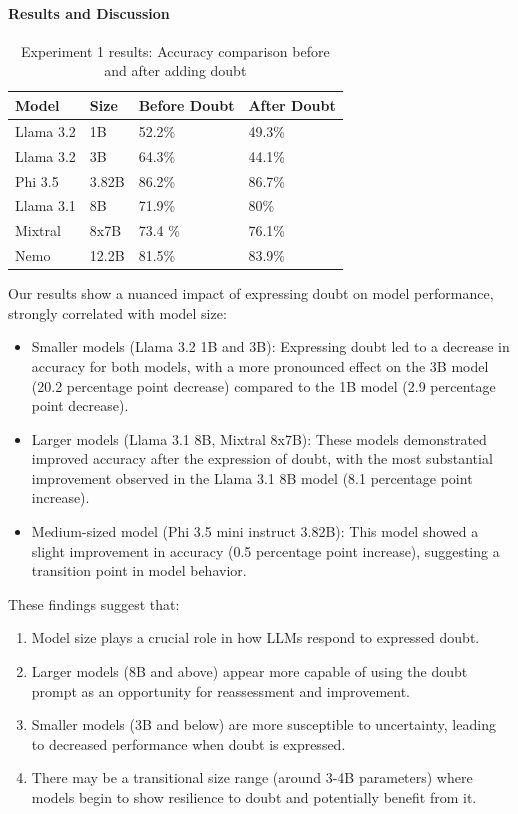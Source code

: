 \paragraph{Results and Discussion}
\begin{table}[h]
    \centering
    \small 
    \begin{tabular}{|l|l|l|l|}
        \hline
        \textbf{Model} & \textbf{Size} & \textbf{Before Doubt} & \textbf{After Doubt} \\
        \hline
        Llama 3.2 & 1B  & 52.2\% & 49.3\% \\
        Llama 3.2 & 3B & 64.3\% & 44.1\% \\
        Phi 3.5 & 3.82B & 86.2\% & 86.7\%\\
        Llama 3.1 & 8B & 71.9\% & 80\% \\
        Mixtral & 8x7B & 73.4 \% & 76.1\% \\
        Nemo & 12.2B & 81.5\% & 83.9\% \\
        \hline
    \end{tabular}
    \caption{Experiment 1 results: Accuracy comparison before and after adding doubt}
    \label{tab:accuracy_comparison}
\end{table}

Our results show a nuanced impact of expressing doubt on model performance, strongly correlated with model size:

\begin{itemize}
    \item Smaller models (Llama 3.2 1B and 3B): Expressing doubt led to a decrease in accuracy for both models, with a more pronounced effect on the 3B model (20.2 percentage point decrease) compared to the 1B model (2.9 percentage point decrease).
    
    \item Larger models (Llama 3.1 8B, Mixtral 8x7B): These models demonstrated improved accuracy after the expression of doubt, with the most substantial improvement observed in the Llama 3.1 8B model (8.1 percentage point increase).
    
    \item Medium-sized model (Phi 3.5 mini instruct 3.82B): This model showed a slight improvement in accuracy (0.5 percentage point increase), suggesting a transition point in model behavior.
\end{itemize}

These findings suggest that:

\begin{enumerate}
    \item Model size plays a crucial role in how LLMs respond to expressed doubt.
    \item Larger models (8B and above) appear more capable of using the doubt prompt as an opportunity for reassessment and improvement.
    \item Smaller models (3B and below) are more susceptible to uncertainty, leading to decreased performance when doubt is expressed.
    \item There may be a transitional size range (around 3-4B parameters) where models begin to show resilience to doubt and potentially benefit from it.
\end{enumerate}

